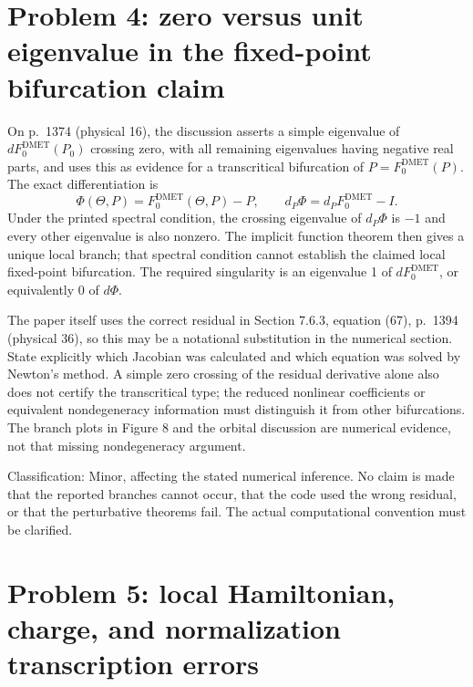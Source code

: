 \documentclass[10pt]{article}
\begin{document}
\section*{Problem 4: zero versus unit eigenvalue in the fixed-point bifurcation claim}
On p. 1374 (physical 16), the discussion asserts a simple eigenvalue of \(dF^\mathrm{DMET}_0(P_0)\) crossing zero, with all remaining eigenvalues having negative real parts, and uses this as evidence for a transcritical bifurcation of \(P=F^\mathrm{DMET}_0(P)\). The exact differentiation is \[\Phi(\Theta,P)=F^\mathrm{DMET}_0(\Theta,P)-P,\qquad
 d_P\Phi=d_PF^\mathrm{DMET}_0-I.
 \tag{R4}\] Under the printed spectral condition, the crossing eigenvalue of \(d_P\Phi\) is \(-1\) and every other eigenvalue is also nonzero. The implicit function theorem then gives a unique local branch; that spectral condition cannot establish the claimed local fixed-point bifurcation. The required singularity is an eigenvalue 1 of \(dF^\mathrm{DMET}_0\), or equivalently 0 of \(d\Phi\).\par
The paper itself uses the correct residual in Section 7.6.3, equation (67), p. 1394 (physical 36), so this may be a notational substitution in the numerical section. State explicitly which Jacobian was calculated and which equation was solved by Newton’s method. A simple zero crossing of the residual derivative alone also does not certify the transcritical type; the reduced nonlinear coefficients or equivalent nondegeneracy information must distinguish it from other bifurcations. The branch plots in Figure 8 and the orbital discussion are numerical evidence, not that missing nondegeneracy argument.\par
Classification: Minor, affecting the stated numerical inference. No claim is made that the reported branches cannot occur, that the code used the wrong residual, or that the perturbative theorems fail. The actual computational convention must be clarified.\par
\section*{Problem 5: local Hamiltonian, charge, and normalization transcription errors}
\end{document}
